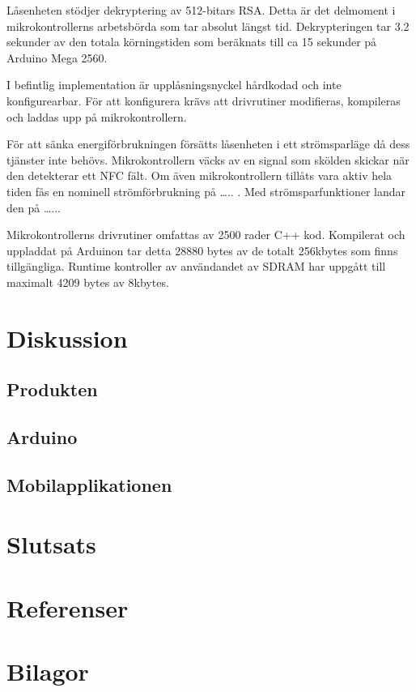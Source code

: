\documentclass[11pt]{article}
\begin{document}
Låsenheten stödjer dekryptering av 512-bitars RSA. Detta är det delmoment i mikrokontrollerns arbetsbörda som tar absolut längst tid. Dekrypteringen tar 3.2 sekunder av den totala körningstiden som beräknats till ca 15 sekunder på Arduino Mega 2560. 

I befintlig implementation är upplåsningsnyckel hårdkodad och inte konfigurearbar. För att konfigurera krävs att drivrutiner modifieras, kompileras och laddas upp på mikrokontrollern. 

För att sänka energiförbrukningen försätts låsenheten i ett strömsparläge då dess tjänster inte behövs. Mikrokontrollern väcks av en signal som skölden skickar när den detekterar ett NFC fält. Om även mikrokontrollern tillåts vara aktiv hela tiden fås en nominell strömförbrukning på ….. . Med strömsparfunktioner landar den på …...

Mikrokontrollerns drivrutiner omfattas av 2500 rader C++ kod. Kompilerat och uppladdat på Arduinon tar detta 28880 bytes av de totalt 256kbytes som finns tillgängliga. Runtime kontroller av användandet av SDRAM har uppgått till maximalt 4209 bytes av 8kbytes.  

\section{Diskussion}

\subsection{Produkten}

\subsection{Arduino}

\subsection{Mobilapplikationen}

\section{Slutsats}

\section*{Referenser}

\section*{Bilagor}
\end{document}
